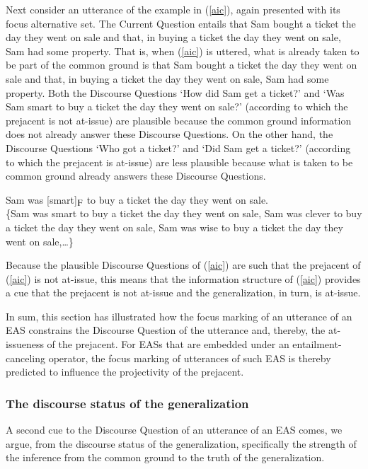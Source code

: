 \documentclass[11pt,fleqn]{article}
\newcommand{\foc}{$_{\mbox{\small F}}$}
\newcommand{\6}{\mbox{$[\hspace*{-.6mm}[$}}
\newcommand{\9}{\mbox{$]\hspace*{-.6mm}]$}}
\begin{document}
Next consider an utterance of the example in (\ref{aic}), again presented with its focus alternative set. The Current Question entails that Sam bought a ticket the day they went on sale and that, in buying a ticket the day they went on sale, Sam had some property. That is, when (\ref{aic}) is uttered, what is already taken to be part of the common ground is that Sam bought a ticket the day they went on sale and that, in buying a ticket the day they went on sale, Sam had some property. Both the Discourse Questions `How did Sam get a ticket?' and `Was Sam smart to buy a ticket the day they went on sale?' (according to which the prejacent is not at-issue) are plausible because the common ground information does not already answer these Discourse Questions. On the other hand, the Discourse Questions `Who got a ticket?' and `Did Sam get a ticket?' (according to which the prejacent is at-issue) are less plausible because what is taken to be common ground already answers these Discourse Questions. 

\begin{exe}
\ex\label{aic} Sam was [smart]\foc{} to buy a ticket the day they went on sale.
\\ \{Sam was smart to buy a ticket the day they went on sale, Sam was clever to buy a ticket the day they went on sale, Sam was wise to buy a ticket the day they went on sale,\ldots\}
\end{exe}
Because the plausible Discourse Questions of (\ref{aic}) are such that the prejacent of (\ref{aic}) is not at-issue, this means that the information structure of (\ref{aic}) provides a cue that the prejacent is not at-issue and the generalization, in turn, is at-issue.

In sum, this section has illustrated how the focus marking of an utterance of an EAS constrains the Discourse Question of the utterance and, thereby, the at-issueness of the prejacent. For EASs that are embedded under an entailment-canceling operator, the focus marking of utterances of such EAS is thereby predicted to influence the projectivity of the prejacent.


\subsubsection{The discourse status of the generalization}\label{s332}

A second cue to the Discourse Question of an utterance of an EAS comes, we argue, from the discourse status of the generalization, specifically the strength of the inference from the common ground to the truth of the generalization.
\end{document}

